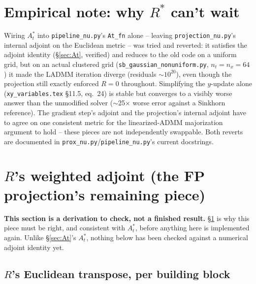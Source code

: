 \documentclass[11pt]{article}
\newcommand{\code}[1]{\texttt{#1}}
\begin{document}
\section{Empirical note: why $R^*$ can't wait}
\label{sec:empirical}

Wiring $A_t^*$ into \code{pipeline\_nu.py}'s \code{At\_fn} alone -- leaving
\code{projection\_nu.py}'s internal adjoint on the Euclidean metric -- was tried and
reverted: it satisfies the adjoint identity (\S\ref{sec:At}, verified) and reduces to the
old code on a uniform grid, but on an actual clustered grid
(\code{sb\_gaussian\_nonuniform.py}, $n_t=n_x=64$) it made the LADMM iteration diverge
(residuals $\sim10^{20}$), even though the projection still exactly enforced $R=0$
throughout. Simplifying the $y$-update alone (\code{xy\_variables.tex} \S11.5, eq.\ 24)
is stable but converges to a visibly worse answer than the unmodified solver
($\sim$25$\times$ worse error against a Sinkhorn reference). The gradient step's adjoint
and the projection's internal adjoint have to agree on one consistent metric for the
linearized-ADMM majorization argument to hold -- these pieces are not independently
swappable. Both reverts are documented in \code{prox\_nu.py}/\code{pipeline\_nu.py}'s
current docstrings.

\section{$R$'s weighted adjoint (the FP projection's remaining piece)}
\label{sec:Rstar}

\textbf{This section is a derivation to check, not a finished result.} \S\ref{sec:empirical}
is why this piece must be right, and consistent with $A_t^*$, before anything here is
implemented again. Unlike \S\ref{sec:At}'s $A_t^*$, nothing below has been checked
against a numerical adjoint identity yet.

\subsection{$R$'s Euclidean transpose, per building block}
\end{document}
